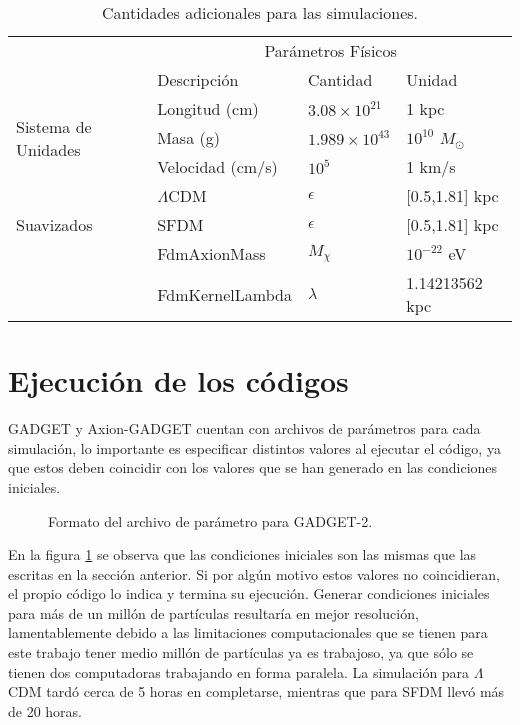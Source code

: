 \documentclass[a4paper,openright,12pt]{book}
\begin{document}
\begin{table}[htb]
\centering
\begin{tabular}{|l|l|l|l|}
\hline
& \multicolumn{3}{c|}{Par\'ametros F\'isicos} \\
\cline{2-4}
& Descripci\'on & Cantidad & Unidad\\
\hline \hline
\multirow{3}{2cm}{Sistema de Unidades}
& Longitud (cm) &  $3.08\times 10^{21}$  & 1 kpc\\ \cline{2-4}
& Masa (g) & $1.989\times 10^{43}$ & $10^{10}$ $M_{\odot}$\\ \cline{2-4}
& Velocidad (cm/s) & $10^{5}$  &1 km/s\\ \cline{1-4}
\multirow{3}{1cm}{Suavizados} & $\Lambda$CDM & $\epsilon$ & [0.5,1.81] kpc\\ \cline{2-4}
& SFDM & $\epsilon$ & [0.5,1.81] kpc\\ \cline{1-4}
\multirow{3}{2cm}{SFDM} & FdmAxionMass & $M_{\chi}$  & $10^{-22}$ eV \\ \cline{2-4}
& FdmKernelLambda & $\lambda$ & 1.14213562 kpc \\ \cline{1-4}
\end{tabular}
\caption{Cantidades adicionales para las simulaciones.}
\end{table}

\section{Ejecución de los códigos}
GADGET y Axion-GADGET cuentan con archivos de parámetros para cada simulación, lo importante es especificar distintos valores al ejecutar el código, ya que estos deben coincidir con los valores que se han generado en las condiciones iniciales.
\begin{figure}[]
\centering
{}
\caption{\footnotesize{Formato del archivo de parámetro para GADGET-2.}} \label{fig 4.1}
\end{figure}
En la figura \ref{fig 4.1} se observa que las condiciones iniciales son las mismas que las escritas en la sección anterior. Si por algún motivo estos valores no coincidieran, el propio código lo indica y termina su ejecución. Generar condiciones iniciales para más de un millón de partículas resultaría en mejor resolución, lamentablemente debido a las limitaciones computacionales que se tienen para este trabajo tener medio millón de partículas ya es trabajoso, ya que sólo se tienen dos computadoras trabajando en forma paralela. La simulación para $\Lambda$CDM tardó cerca de 5 horas en completarse, mientras que para SFDM llevó más de 20 horas.
\end{document}

